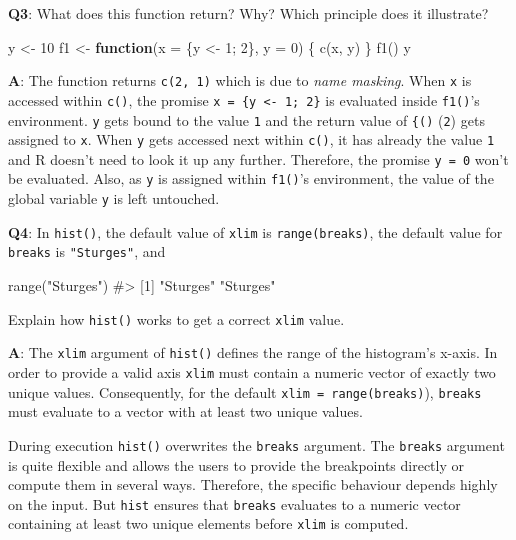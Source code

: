 \documentclass[
]{krantz}
\makeatletter
\newenvironment{Shaded}{\begin{snugshade}}{\end{snugshade}}
\newcommand{\CommentTok}[1]{\textcolor[rgb]{0.56,0.35,0.01}{\textit{#1}}}
\newcommand{\ControlFlowTok}[1]{\textcolor[rgb]{0.13,0.29,0.53}{\textbf{#1}}}
\newcommand{\DataTypeTok}[1]{\textcolor[rgb]{0.13,0.29,0.53}{#1}}
\newcommand{\DecValTok}[1]{\textcolor[rgb]{0.00,0.00,0.81}{#1}}
\newcommand{\KeywordTok}[1]{\textcolor[rgb]{0.13,0.29,0.53}{\textbf{#1}}}
\newcommand{\NormalTok}[1]{#1}
\newcommand{\StringTok}[1]{\textcolor[rgb]{0.31,0.60,0.02}{#1}}
\newenvironment{kframe}{%
\medskip{}
\setlength{\fboxsep}{.8em}
 \def\at@end@of@kframe{}%
 \ifinner\ifhmode%
  \def\at@end@of@kframe{\end{minipage}}%
  \begin{minipage}{\columnwidth}%
 \fi\fi%
 \def\FrameCommand##1{\hskip\@totalleftmargin \hskip-\fboxsep
 \colorbox{shadecolor}{##1}\hskip-\fboxsep
     \hskip-\linewidth \hskip-\@totalleftmargin \hskip\columnwidth}%
 \MakeFramed {\advance\hsize-\width
   \@totalleftmargin\z@ \linewidth\hsize
   \@setminipage}}%
 {\par\unskip\endMakeFramed%
 \at@end@of@kframe}
\renewenvironment{Shaded}{\begin{kframe}}{\end{kframe}}
\renewcommand{\KeywordTok} [1]{\textcolor[rgb]{0.00,0.44,0.13}{{#1}}}
\renewcommand{\DataTypeTok}[1]{\textcolor[rgb]{0.56,0.13,0.00}{{#1}}}
\renewcommand{\DecValTok}  [1]{\textcolor[rgb]{0.25,0.63,0.44}{{#1}}}
\renewcommand{\StringTok}  [1]{\textcolor[rgb]{0.25,0.44,0.63}{{#1}}}
\renewcommand{\CommentTok} [1]{\textcolor[rgb]{0.38,0.63,0.69}{{#1}}}
\renewcommand{\NormalTok}  [1]{{#1}}
\makeatother
\begin{document}
\textbf{{Q3}}: What does this function return? Why? Which principle does it illustrate?

\begin{Shaded}
\begin{Highlighting}[]
\NormalTok{y <-}\StringTok{ }\DecValTok{10}
\NormalTok{f1 <-}\StringTok{ }\ControlFlowTok{function}\NormalTok{(}\DataTypeTok{x =}\NormalTok{ \{y <-}\StringTok{ }\DecValTok{1}\NormalTok{; }\DecValTok{2}\NormalTok{\}, }\DataTypeTok{y =} \DecValTok{0}\NormalTok{) \{}
  \KeywordTok{c}\NormalTok{(x, y)}
\NormalTok{\}}
\KeywordTok{f1}\NormalTok{()}
\NormalTok{y}
\end{Highlighting}
\end{Shaded}

\textbf{{A}}: The function returns \texttt{c(2,\ 1)} which is due to \emph{name masking}. When \texttt{x} is accessed within \texttt{c()}, the promise \texttt{x\ =\ \{y\ \textless{}-\ 1;\ 2\}} is evaluated inside \texttt{f1()}'s environment. \texttt{y} gets bound to the value \texttt{1} and the return value of \texttt{\{()} (\texttt{2}) gets assigned to \texttt{x}. When \texttt{y} gets accessed next within \texttt{c()}, it has already the value \texttt{1} and R doesn't need to look it up any further. Therefore, the promise \texttt{y\ =\ 0} won't be evaluated. Also, as \texttt{y} is assigned within \texttt{f1()}'s environment, the value of the global variable \texttt{y} is left untouched.

\textbf{{Q4}}: In \texttt{hist()}, the default value of \texttt{xlim} is \texttt{range(breaks)}, the default value for \texttt{breaks} is \texttt{"Sturges"}, and

\begin{Shaded}
\begin{Highlighting}[]
\KeywordTok{range}\NormalTok{(}\StringTok{"Sturges"}\NormalTok{)}
\CommentTok{#> [1] "Sturges" "Sturges"}
\end{Highlighting}
\end{Shaded}

Explain how \texttt{hist()} works to get a correct \texttt{xlim} value.

\textbf{{A}}: The \texttt{xlim} argument of \texttt{hist()} defines the range of the histogram's x-axis. In order to provide a valid axis \texttt{xlim} must contain a numeric vector of exactly two unique values. Consequently, for the default \texttt{xlim\ =\ range(breaks)}), \texttt{breaks} must evaluate to a vector with at least two unique values.

During execution \texttt{hist()} overwrites the \texttt{breaks} argument. The \texttt{breaks} argument is quite flexible and allows the users to provide the breakpoints directly or compute them in several ways. Therefore, the specific behaviour depends highly on the input. But \texttt{hist} ensures that \texttt{breaks} evaluates to a numeric vector containing at least two unique elements before \texttt{xlim} is computed.
\end{document}

